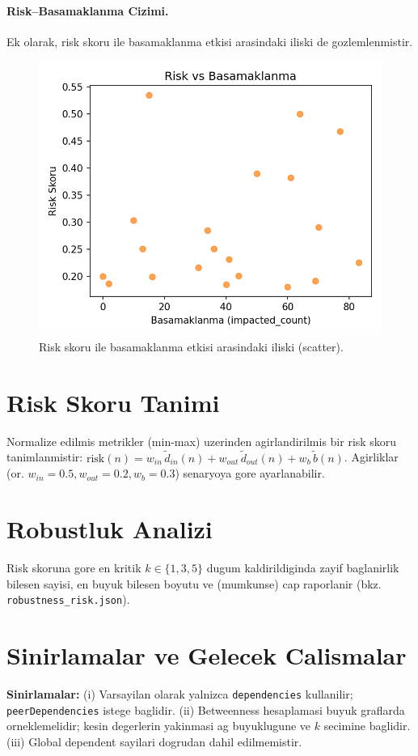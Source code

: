 \documentclass[11pt,a4paper]{article}
\begin{document}
\paragraph{Risk--Basamaklanma Cizimi.} Ek olarak, risk skoru ile basamaklanma etkisi arasindaki iliski de gozlemlenmistir.
\begin{figure}[h]
  \centering
  \includegraphics[width=0.6\linewidth]{risk_vs_cascade.png}
  \caption{Risk skoru ile basamaklanma etkisi arasindaki iliski (scatter).}
\end{figure}

\section{Risk Skoru Tanimi}
Normalize edilmis metrikler (min-max) uzerinden agirlandirilmis bir risk skoru tanimlanmistir: $\mathrm{risk}(n) = w_{in}\,\tilde d_{in}(n) + w_{out}\,\tilde d_{out}(n) + w_b\,\tilde b(n)$. Agirliklar (or. $w_{in}=0.5, w_{out}=0.2, w_b=0.3$) senaryoya gore ayarlanabilir.

\section{Robustluk Analizi}
Risk skoruna gore en kritik $k\in\{1,3,5\}$ dugum kaldirildiginda zayif baglanirlik bilesen sayisi, en buyuk bilesen boyutu ve (mumkunse) cap raporlanir (bkz. \texttt{robustness\_risk.json}).

\section{Sinirlamalar ve Gelecek Calismalar}
\textbf{Sinirlamalar:} (i) Varsayilan olarak yalnizca \texttt{dependencies} kullanilir; \texttt{peerDependencies} istege baglidir. (ii) Betweenness hesaplamasi buyuk graflarda orneklemelidir; kesin degerlerin yakinmasi ag buyuklugune ve $k$ secimine baglidir. (iii) Global dependent sayilari dogrudan dahil edilmemistir.
\end{document}
